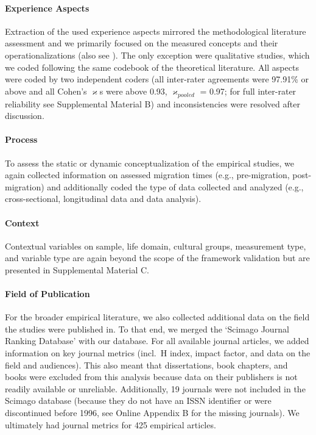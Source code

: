 \paragraph{Experience Aspects}

Extraction of the used experience aspects mirrored the methodological
literature assessment and we primarily focused on the measured concepts
and their operationalizations (also see ).
The only exception were qualitative studies, which we coded following
the same codebook of the theoretical literature. All aspects were coded
by two independent coders (all inter-rater agreements were 97.91\% or
above and all Cohen's \(\varkappa\)s were above 0.93,
\(\varkappa_{pooled}\) = 0.97; for full inter-rater reliability see
Supplemental Material B) and inconsistencies were resolved after
discussion.

\paragraph{Process}

To assess the static or dynamic conceptualization of the empirical
studies, we again collected information on assessed migration times
(e.g., pre-migration, post-migration) and additionally coded the type of
data collected and analyzed (e.g., cross-sectional, longitudinal data
and data analysis).

\paragraph{Context}

Contextual variables on sample, life domain, cultural groups,
measurement type, and variable type are again beyond the scope of the
framework validation but are presented in Supplemental Material C.

\paragraph{Field of Publication}

For the broader empirical literature, we also collected additional data
on the field the studies were published in. To that end, we merged the
`Scimago Journal Ranking Database' \citep{SCImago2020} with our
database. For all available journal articles, we added information on
key journal metrics (incl.~H index, impact factor, and data on the field
and audiences). This also meant that dissertations, book chapters, and
books were excluded from this analysis because data on their publishers
is not readily available or unreliable. Additionally, 19 journals were
not included in the Scimago database (because they do not have an ISSN
identifier or were discontinued before 1996, see Online Appendix B for
the missing journals). We ultimately had journal metrics for 425
empirical articles.

